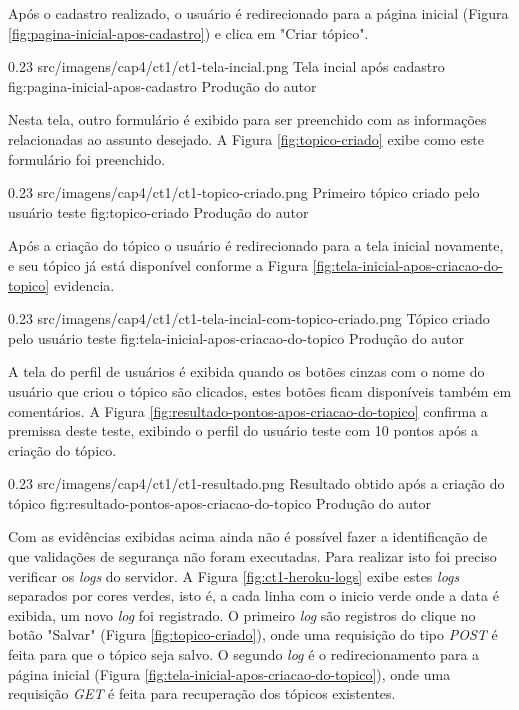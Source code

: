 \par Após o cadastro realizado, o usuário é redirecionado para a página inicial (Figura \ref{fig:pagina-inicial-apos-cadastro}) e clica em "Criar tópico".

\begin{image}
{0.23}
{src/imagens/cap4/ct1/ct1-tela-incial.png}
{Tela incial após cadastro}
{fig:pagina-inicial-apos-cadastro}
{Produção do autor}
\end{image}

\par Nesta tela, outro formulário é exibido para ser preenchido com as informações relacionadas ao assunto desejado. A Figura \ref{fig:topico-criado} exibe como este formulário foi preenchido.

\begin{image}
{0.23}
{src/imagens/cap4/ct1/ct1-topico-criado.png}
{Primeiro tópico criado pelo usuário teste}
{fig:topico-criado}
{Produção do autor}
\end{image}

\par Após a criação do tópico o usuário é redirecionado para a tela inicial novamente, e seu tópico já está disponível conforme a Figura \ref{fig:tela-inicial-apos-criacao-do-topico} evidencia.

\begin{image}
{0.23}
{src/imagens/cap4/ct1/ct1-tela-incial-com-topico-criado.png}
{Tópico criado pelo usuário teste}
{fig:tela-inicial-apos-criacao-do-topico}
{Produção do autor}
\end{image}

\par A tela do perfil de usuários é exibida quando os botões cinzas com o nome do usuário que criou o tópico são clicados, estes botões ficam disponíveis também em comentários. A Figura \ref{fig:resultado-pontos-apos-criacao-do-topico} confirma a premissa deste teste, exibindo o perfil do usuário teste com 10 pontos após a criação do tópico.

\begin{image}
{0.23}
{src/imagens/cap4/ct1/ct1-resultado.png}
{Resultado obtido após a criação do tópico}
{fig:resultado-pontos-apos-criacao-do-topico}
{Produção do autor}
\end{image}

\par Com as evidências exibidas acima ainda não é possível fazer a identificação de que validações de segurança não foram executadas. Para realizar isto foi preciso verificar os \textit{logs} do servidor. A Figura \ref{fig:ct1-heroku-logs} exibe estes \textit{logs} separados por cores verdes, isto é, a cada linha com o inicio verde onde a data é exibida, um novo \textit{log} foi registrado. O primeiro \textit{log} são registros do clique no botão "Salvar" (Figura \ref{fig:topico-criado}), onde uma requisição do tipo \textit{POST} é feita para que o tópico seja salvo. O segundo \textit{log} é o redirecionamento para a página inicial (Figura \ref{fig:tela-inicial-apos-criacao-do-topico}), onde uma requisição \textit{GET} é feita para recuperação dos tópicos existentes.

